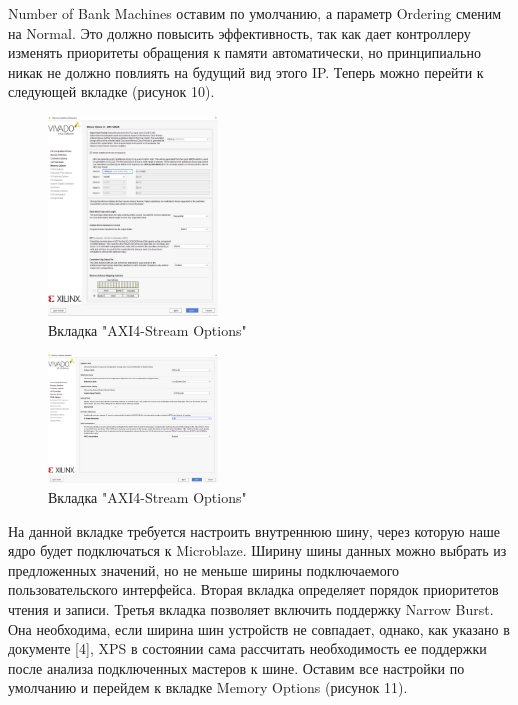 \documentclass[a4paper,oneside ,10pt]{extreport}
\begin{document}
Number of Bank Machines оставим по умолчанию, а параметр Ordering сменим на Normal. Это должно повысить эффективность, так как дает контроллеру изменять приоритеты обращения к памяти автоматически, но принципиально никак не должно повлиять на будущий вид этого IP. Теперь можно перейти к следующей вкладке (рисунок 10).

\begin{figure}[h]
	\centering
	\includegraphics[width=0.4\textwidth]{image/mig_6.png}
	\caption{Вкладка "AXI4-Stream Options"}
	\label{cordic_axi4_stream_options}
\end{figure}

\begin{figure}[h]
	\centering
	\includegraphics[width=0.4\textwidth]{image/mig_7.png}
	\caption{Вкладка "AXI4-Stream Options"}
	\label{cordic_axi4_stream_options}
\end{figure}

На данной вкладке требуется настроить внутреннюю шину, через которую наше ядро будет подключаться к Microblaze. Ширину шины данных можно выбрать из предложенных значений, но не меньше ширины подключаемого пользовательского интерфейса. Вторая вкладка определяет порядок приоритетов чтения и записи. Третья вкладка позволяет включить поддержку Narrow Burst. Она необходима, если ширина шин устройств не совпадает, однако, как указано в документе [4], XPS в состоянии сама рассчитать необходимость ее поддержки после анализа подключенных мастеров к шине. Оставим все настройки по умолчанию и перейдем к вкладке Memory Options (рисунок 11).
\end{document}
